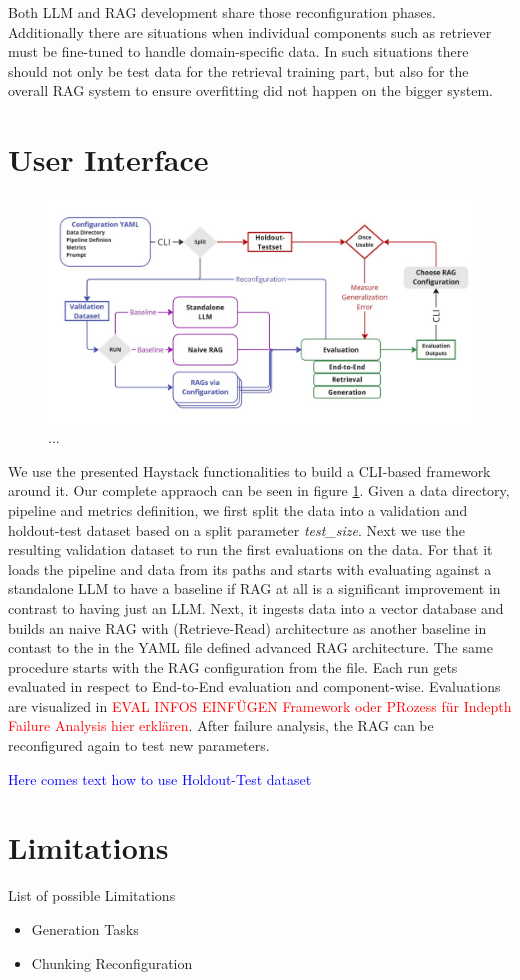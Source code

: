 Both LLM and RAG development share those reconfiguration phases. Additionally there are situations when individual components such as retriever must be fine-tuned to handle domain-specific data. In such situations there should not only be test data for the retrieval training part, but also for the overall RAG system to ensure overfitting did not happen on the bigger system.


\section{User Interface}

\begin{figure}[!ht]
    \centering
    \includegraphics[width=\textwidth]{images/Sketch.pdf}
    \caption{...}
    \label{fig:EvaluationDesign}
\end{figure}

We use the presented Haystack functionalities to build a CLI-based framework around it. Our complete appraoch can be seen in figure \ref{fig:EvaluationDesign}. Given a data directory, pipeline and metrics definition, we first split the data into a validation and holdout-test dataset based on a split parameter \textit{test\_size}. Next we use the resulting validation dataset to run the first evaluations on the data. For that it loads the pipeline and data from its paths and starts with evaluating against a standalone LLM to have a baseline if RAG at all is a significant improvement in contrast to having just an LLM. Next, it ingests data into a vector database and builds an naive RAG with (Retrieve-Read) architecture as another baseline in contast to the in the YAML file defined advanced RAG architecture. The same procedure starts with the RAG configuration from the file. Each run gets evaluated in respect to End-to-End evaluation and component-wise. Evaluations are visualized in \textcolor{red}{EVAL INFOS EINFÜGEN Framework oder PRozess für Indepth Failure Analysis hier erklären}. After failure analysis, the RAG can be reconfigured again to test new parameters. 

\textcolor{blue}{Here comes text how to use Holdout-Test dataset}



\section{Limitations}

List of possible Limitations

\begin{itemize}
    \item Generation Tasks 
    \item Chunking Reconfiguration
\end{itemize}